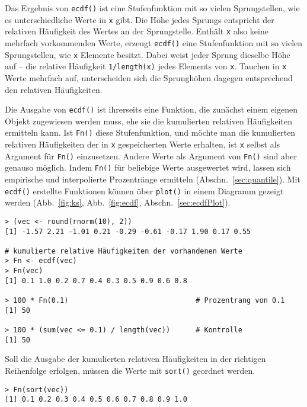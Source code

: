 Das Ergebnis von \lstinline!ecdf()! ist eine Stufenfunktion mit so vielen Sprungstellen, wie es unterschiedliche Werte in \lstinline!x! gibt. Die Höhe jedes Sprungs entspricht der relativen Häufigkeit des Wertes an der Sprungstelle. Enthält \lstinline!x! also keine mehrfach vorkommenden Werte, erzeugt \lstinline!ecdf()! eine Stufenfunktion mit so vielen Sprungstellen, wie \lstinline!x! Elemente besitzt. Dabei weist jeder Sprung dieselbe Höhe auf -- die relative Häufigkeit \lstinline!1/length(x)! jedes Elements von \lstinline!x!. Tauchen in \lstinline!x! Werte mehrfach auf, unterscheiden sich die Sprunghöhen dagegen entsprechend den relativen Häufigkeiten.

Die Ausgabe von \lstinline!ecdf()! ist ihrerseits eine Funktion, die zunächst einem eigenen Objekt zugewiesen werden muss, ehe sie die kumulierten relativen Häufigkeiten ermitteln kann. Ist \lstinline!Fn()! diese Stufenfunktion, und möchte man die kumulierten relativen Häufigkeiten der in \lstinline!x! gespeicherten Werte erhalten, ist \lstinline!x! selbst als Argument für \lstinline!Fn()! einzusetzen. Andere Werte als Argument von \lstinline!Fn()! sind aber genauso möglich. Indem \lstinline!Fn()! für beliebige Werte ausgewertet wird, lassen sich empirische und interpolierte Prozentränge ermitteln (Abschn.\ \ref{sec:quantile}). Mit \lstinline!ecdf()! erstellte Funktionen können über \lstinline!plot()! in einem Diagramm gezeigt werden (Abb.\ \ref{fig:ks}, Abb.\ \ref{fig:ecdf}, Abschn.\ \ref{sec:ecdfPlot}).
\begin{lstlisting}
> (vec <- round(rnorm(10), 2))
[1] -1.57 2.21 -1.01 0.21 -0.29 -0.61 -0.17 1.90 0.17 0.55

# kumulierte relative Häufigkeiten der vorhandenen Werte
> Fn <- ecdf(vec)
> Fn(vec)
[1] 0.1 1.0 0.2 0.7 0.4 0.3 0.5 0.9 0.6 0.8

> 100 * Fn(0.1)                              # Prozentrang von 0.1
[1] 50

> 100 * (sum(vec <= 0.1) / length(vec))      # Kontrolle
[1] 50
\end{lstlisting}

Soll die Ausgabe der kumulierten relativen Häufigkeiten in der richtigen Reihenfolge erfolgen, müssen die Werte mit \lstinline!sort()! geordnet werden.
\begin{lstlisting}
> Fn(sort(vec))
[1] 0.1 0.2 0.3 0.4 0.5 0.6 0.7 0.8 0.9 1.0
\end{lstlisting}

